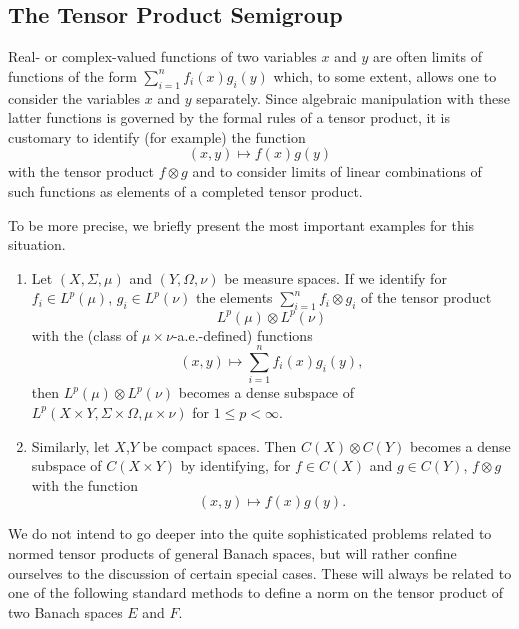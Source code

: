 \subsection{The Tensor Product Semigroup}\label{subsec:a1-3.8}%
Real- or complex-valued functions of two variables $x$ and $y$ are often limits of functions of the form $\sum_{i=1}^{n} f_{i}(x)g_{i}(y)$ which, to some extent, allows one to consider the variables $x$ and $y$ separately.
Since algebraic manipulation with these latter functions is governed by the formal rules of a tensor product, it is customary to identify (for example) the function
\[
    (x,y) \mapsto f(x)g(y)
\]
with the tensor product $f \otimes g$ and to consider limits of linear combinations of such functions as elements of a completed tensor product.

To be more precise, we briefly present the most important examples for this situation.
\begin{examples*}\label{ex:a1-5.1}
\begin{enumerate}[\upshape(i), wide, labelindent=.25em]

\item
Let $(X,\Sigma,\mu)$ and $(Y,\Omega,\nu)$ be measure spaces. 
If we identify for $f_{i} \in L^{p}(\mu)$, $g_{i} \in L^{p}(\nu)$ the elements $\sum_{i=1}^{n} f_{i} \otimes g_{i}$ of the tensor product
\[
    L^{p}(\mu) \otimes L^{p}(\nu)
\]
with the (class of\/ $\mu \times \nu$-a.e.-defined) functions
\[
    (x,y) \mapsto \sum_{i=1}^{n} f_{i}(x)g_{i}(y) ,
\]
then $L^{p}(\mu) \otimes L^{p}(\nu)$ becomes a dense subspace of\/ $L^{p}(X\times Y,\Sigma\times\Omega,\mu\times\nu)$ for $1 \leq p < \infty$.

\item
Similarly, let $X$,$Y$ be compact spaces. Then $C(X) \otimes C(Y)$ becomes a dense subspace of\/ $C(X\times Y)$ by identifying, for $f \in C(X)$ and $g \in C(Y)$, $f \otimes g$ with the function
\[
    (x,y) \mapsto f(x)g(y) .
\]
\end{enumerate}
\end{examples*}
We do not intend to go deeper into the quite sophisticated problems related to normed tensor products of general Banach spaces, but will rather confine ourselves to the discussion of certain special cases.
These will always be related to one of the following standard methods to define a norm on the tensor product of two Banach spaces $E$ and $F$.

